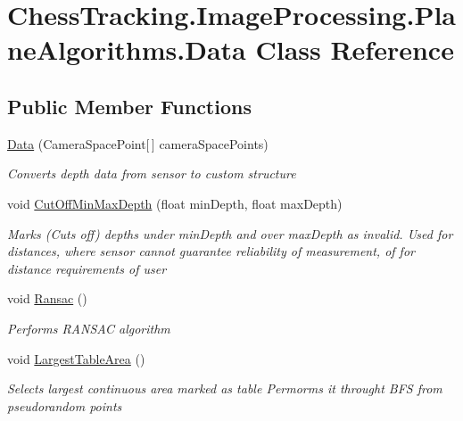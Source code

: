 \hypertarget{class_chess_tracking_1_1_image_processing_1_1_plane_algorithms_1_1_data}{}\section{Chess\+Tracking.\+Image\+Processing.\+Plane\+Algorithms.\+Data Class Reference}
\label{class_chess_tracking_1_1_image_processing_1_1_plane_algorithms_1_1_data}
\subsection*{Public Member Functions}
\begin{DoxyCompactItemize}
\item 
\mbox{\hyperlink{class_chess_tracking_1_1_image_processing_1_1_plane_algorithms_1_1_data_a981b5f67df7728802365e20ee8a1d0f5}{Data}} (Camera\+Space\+Point\mbox{[}$\,$\mbox{]} camera\+Space\+Points)
\begin{DoxyCompactList}\small\item\em Converts depth data from sensor to custom structure \end{DoxyCompactList}\item 
void \mbox{\hyperlink{class_chess_tracking_1_1_image_processing_1_1_plane_algorithms_1_1_data_aafc7ada7cdf88d76166727dc356e80b3}{Cut\+Off\+Min\+Max\+Depth}} (float min\+Depth, float max\+Depth)
\begin{DoxyCompactList}\small\item\em Marks (Cuts off) depths under min\+Depth and over max\+Depth as invalid. Used for distances, where sensor cannot guarantee reliability of measurement, of for distance requirements of user \end{DoxyCompactList}\item 
void \mbox{\hyperlink{class_chess_tracking_1_1_image_processing_1_1_plane_algorithms_1_1_data_a64fe60a4cb39f078d1e9aad796f3ae8f}{Ransac}} ()
\begin{DoxyCompactList}\small\item\em Performs R\+A\+N\+S\+AC algorithm \end{DoxyCompactList}\item 
void \mbox{\hyperlink{class_chess_tracking_1_1_image_processing_1_1_plane_algorithms_1_1_data_ab3a997440f071d189eed862fe4f25465}{Largest\+Table\+Area}} ()
\begin{DoxyCompactList}\small\item\em Selects largest continuous area marked as table Permorms it throught B\+FS from pseudorandom points \end{DoxyCompactList}\item 

\end{DoxyCompactItemize}
